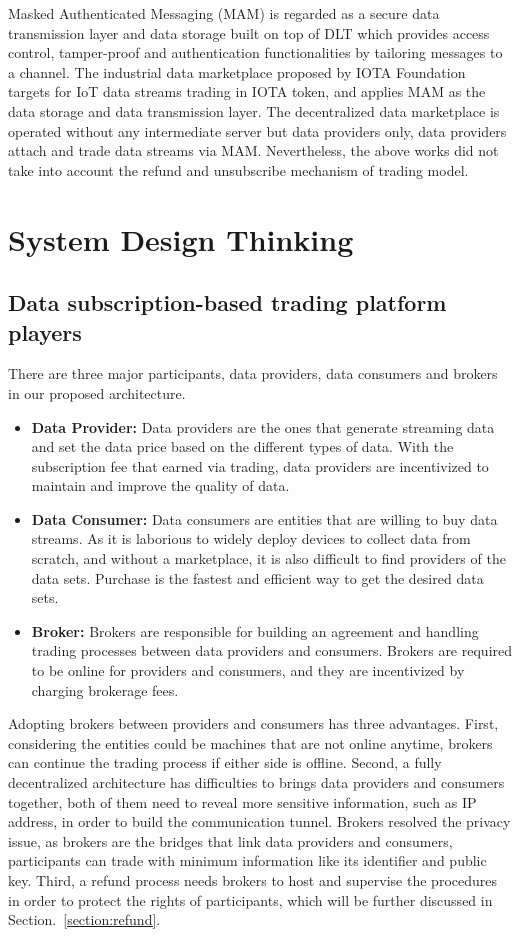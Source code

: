 \documentclass[conference]{IEEEtran}
\begin{document}
Masked Authenticated Messaging (MAM)\cite{MAM} is regarded as a secure data transmission layer and data storage built on top of DLT which provides access control, tamper-proof and authentication functionalities by tailoring messages to a channel. The industrial data marketplace\cite{IOTAIdustryMarketplace} proposed by IOTA Foundation targets for IoT data streams trading in IOTA token, and applies MAM as the data storage and data transmission layer. The decentralized data marketplace\cite{DDMSmartCities} is operated without any intermediate server but data providers only, data providers attach and trade data streams via MAM. Nevertheless, the above works did not take into account the refund and unsubscribe mechanism of trading model.
 
\section{System Design Thinking}
\label{section:design_thinking}
\subsection{Data subscription-based trading platform players}
There are three major participants, data providers, data consumers and brokers in our proposed architecture.

\begin{itemize}
\item \textbf{Data Provider: }
Data providers are the ones that generate streaming data and set the data price based on the different types of data. With the subscription fee that earned via trading, data providers are incentivized to maintain and improve the quality of data.
\item \textbf{Data Consumer: }
Data consumers are entities that are willing to buy data streams. As it is laborious to widely deploy devices to collect data from scratch, and without a marketplace, it is also difficult to find providers of the data sets. Purchase is the fastest and efficient way to get the desired data sets.
\item \textbf{Broker: }
Brokers are responsible for building an agreement and handling trading processes between data providers and consumers. Brokers are required to be online for providers and consumers, and they are incentivized by charging brokerage fees.
\end{itemize}

Adopting brokers between providers and consumers has three advantages. First, considering the entities could be machines that are not online anytime, brokers can continue the trading process if either side is offline. Second, a fully decentralized architecture has difficulties to brings data providers and consumers together, both of them need to reveal more sensitive information, such as IP address, in order to build the communication tunnel. Brokers resolved the privacy issue, as brokers are the bridges that link data providers and consumers, participants can trade with minimum information like its identifier and public key. Third, a refund process needs brokers to host and supervise the procedures in order to protect the rights of participants, which will be further discussed in Section.~\ref{section:refund}.
\end{document}
